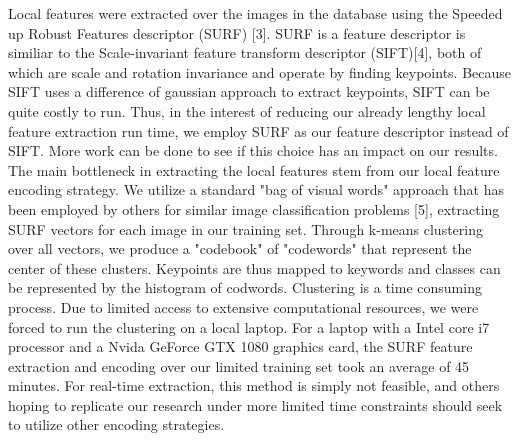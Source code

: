 \documentclass{article}
\begin{document}
\hspace{\parindent}Local features were extracted over the images in the database using the Speeded up Robust Features descriptor (SURF) [3]. SURF is a feature descriptor is similiar to the Scale-invariant feature transform descriptor (SIFT)[4], both of which are scale and rotation invariance and operate by finding keypoints. Because SIFT uses a difference of gaussian approach to extract keypoints, SIFT can be quite costly to run. Thus, in the interest of reducing our already lengthy local feature extraction run time, we employ SURF as our feature descriptor instead of SIFT. More work can be done to see if this choice has an impact on our results.\newline
\indent The main bottleneck in extracting the local features stem from our local feature encoding strategy. We utilize a standard "bag of visual words" approach that has been employed by others for similar image classification problems [5], extracting SURF vectors for each image in our training set. Through k-means clustering over all vectors, we produce a "codebook" of "codewords" that represent the center of these clusters. Keypoints are thus mapped to keywords and classes can be represented by the histogram of codwords.\newline
\indent Clustering is a time consuming process. Due to limited access to extensive computational resources, we were forced to run the clustering on a local laptop. For a laptop with a Intel core i7 processor and a Nvida GeForce GTX 1080 graphics card, the SURF feature extraction and encoding over our limited training set took an average of 45 minutes. For real-time extraction, this method is simply not feasible, and others hoping to replicate our research under more limited time constraints should seek to utilize other encoding strategies.
\end{document}

